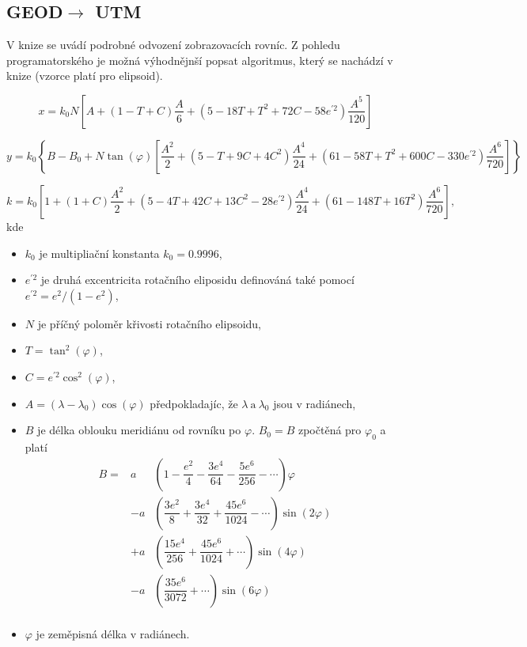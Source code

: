 \documentclass[11pt,a4paper]{article}
\begin{document}
\subsection{GEOD$\rightarrow$ UTM}

V knize \cite{Buchar2002} se uvádí podrobné odvození zobrazovacích rovníc. Z pohledu programatorského je možná výhodnějnší popsat algoritmus, který se nachádzí v knize \cite{Snyder1987} (vzorce platí pro elipsoid).

\begin{equation}
x = k_{0}N\left[A + \left(1-T+C\right)\dfrac{A}{6} + \left(5-18T+T^{2}+72C-58e^{'2}\right)\dfrac{A^{5}}{120}\right]
\end{equation}	

\begin{equation}
y = k_{0}\left\lbrace B - B_{0} + N \tan{\left(\varphi\right)\left[\dfrac{A^{2}}{2} + \left(5-T+9C+4C^{2}\right)\dfrac{A^{4}}{24}+\left(61-58T+T^{2}+600C-330e^{'2}\right)\dfrac{A^{6}}{720}\right]}\right\rbrace
\end{equation}

\begin{equation}
k = k_{0}\left[1+\left(1+C\right)\dfrac{A^{2}}{2}+\left(5-4T+42C+13C^{2}-28e^{'2}\right)\dfrac{A^{4}}{24} + \left(61-148T+16T^{2}\right)\dfrac{A^{6}}{720}\right],
\end{equation}
kde
\begin{itemize}
\item $k_{0}$ je multipliační konstanta $k_{0} = 0.9996$,
\item $e^{'2}$ je druhá excentricita rotačního eliposidu definováná také pomocí $e^{'2} = e^{2}/\left(1-e^{2}\right)$,
\item $N$ je příčný poloměr křivosti rotačního elipsoidu, 
\item $T = \tan^{2}{\left(\varphi\right)}$,
\item $C = e^{'2}\cos^{2}{\left(\varphi\right)}$,
\item $A = \left(\lambda-\lambda_{0}\right)\cos{\left(\varphi\right)}$ předpokladajíc, že $\lambda\ \text{a}\ \lambda_{0}$ jsou v radiánech,
\item $B$ je délka oblouku meridiánu od rovníku po $\varphi$. $B_{0} = B$ zpočtěná pro $\varphi_{0}$ a platí
\begin{eqnarray}\label{rov:B}
B = & a & \left(1 - \dfrac{e^{2}}{4} - \dfrac{3e^{4}}{64} - \dfrac{5e^{6}}{256} - \cdots \right)\varphi \\ \nonumber
    & -a & \left(\dfrac{3e^{2}}{8} + \dfrac{3e^{4}}{32} + \dfrac{45e^{6}}{1024} - \cdots\right)\sin{\left(2\varphi\right)}\\ \nonumber
    & +a & \left(\dfrac{15e^{4}}{256} + \dfrac{45e^{6}}{1024} + \cdots\right)\sin{\left(4\varphi\right)}\\ \nonumber
    & -a & \left(\dfrac{35e^{6}}{3072} + \cdots\right)\sin{\left(6\varphi\right)}\\ \nonumber
\end{eqnarray}
\item $\varphi$ je zeměpisná délka v radiánech.
\end{itemize}
\end{document}
